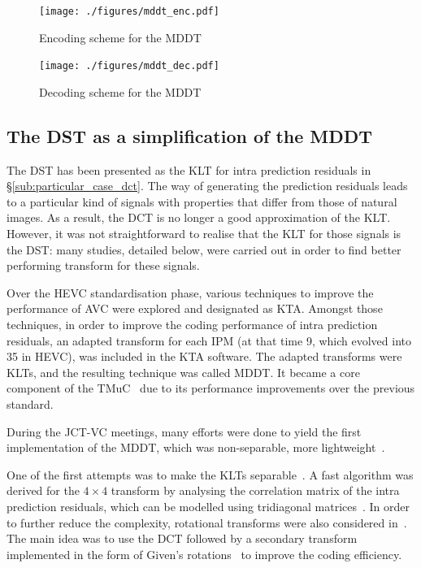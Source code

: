 \documentclass[11pt,a4paper,openright,twoside]{book}
\def\usepdfs{1} %
\numberwithin{equation}{section} %
\numberwithin{figure}{section} %
\numberwithin{table}{section} %
\begin{document}
\begin{figure}[tp]
	\centering
	\ifthenelse{\usepdfs = 0}
	{}
	{\texttt{[image: ./figures/mddt\_enc.pdf]}}
	\caption{Encoding scheme for the \acs{MDDT}}
	\label{fig:mddt_enc}
\end{figure}

\begin{figure}[tp]
	\centering
	\ifthenelse{\usepdfs = 0}
	{}
	{\texttt{[image: ./figures/mddt\_dec.pdf]}}
	\caption{Decoding scheme for the \acs{MDDT}}
	\label{fig:mddt_dec}
\end{figure}

\subsection{The \acs{DST} as a simplification of the \acs{MDDT}}
\label{sub:dst_and_mddt}

The \ac{DST} has been presented as the \ac{KLT} for intra prediction residuals
in \S\ref{sub:particular_case_dct}.
The way of generating the prediction residuals leads to a particular kind of
signals with properties that differ from those of natural images.
As a result, the \ac{DCT} is no longer a good approximation of the \ac{KLT}.
However, it was not straightforward to realise that the \ac{KLT} for those
signals is the \ac{DST}:
many studies, detailed below, were carried out in order to find better
performing transform for these signals.

Over the \ac{HEVC} standardisation phase, various techniques to improve the
performance of \ac{AVC} were explored and designated as \ac{KTA}.
Amongst those techniques, in order to improve the coding performance of intra
prediction residuals, an adapted transform for each \ac{IPM} (at that time 9,
which evolved into 35 in \ac{HEVC}), was included in the \ac{KTA} software.
The adapted transforms were \acp{KLT}, and the resulting technique was called
\ac{MDDT}.
It became a core component of the \ac{TMuC}~\cite{JCTVC-A204} due to its
performance improvements over the previous standard.

During the \ac{JCT-VC} meetings, many efforts were done to yield the first
implementation of the \ac{MDDT}, which was non-separable, more
lightweight~\cite{VCEG-AG11}.

One of the first attempts was to make the \acp{KLT}
separable~\cite{JCTVC-B024}.
A fast algorithm was derived for the $4\times4$ transform by analysing
the correlation matrix of the intra prediction residuals, which can be
modelled using tridiagonal
matrices~\cite{yueh-05-eigenvalues-tridiagonal}.
In order to further reduce the complexity, rotational transforms were
also considered in~\cite{JCTVC-C096}.
The main idea was to use the \ac{DCT} followed by a secondary transform
implemented in the form of Given's
rotations~\cite{yang-04-matrix-decomposition} to improve the coding
efficiency.
\end{document}

